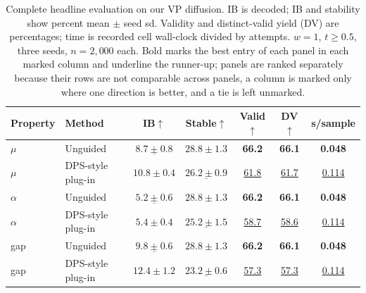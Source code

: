 \documentclass{article}
\begin{document}
\clearpage
\begin{table}[!htbp]
\centering\small
\caption{Complete headline evaluation on our VP diffusion. IB is decoded; IB and stability show percent mean $\pm$ seed sd. Validity and distinct-valid yield (DV) are percentages; time is recorded cell wall-clock divided by attempts. $w=1$, $t\ge0.5$, three seeds, $n=2{,}000$ each. Bold marks the best entry of each panel in each marked column and underline the runner-up; panels are ranked separately because their rows are not comparable across panels, a column is marked only where one direction is better, and a tie is left unmarked.}
\label{tab:full-vp}
\begin{tabular}{llccccc}
\toprule
Property & Method & IB$\uparrow$ & Stable$\uparrow$ & Valid$\uparrow$ & DV$\uparrow$ & s/sample\\
\midrule
$\mu$ & Unguided & $\underline{8.7\pm0.8}$& $\mathbf{28.8\pm1.3}$& \textbf{66.2}& \textbf{66.1}& \textbf{0.048}\\
$\mu$ & DPS-style plug-in & $\mathbf{10.8\pm0.4}$& $\underline{26.2\pm0.9}$& \underline{61.8}& \underline{61.7}& \underline{0.114}\\
\midrule
$\alpha$ & Unguided & $\underline{5.2\pm0.6}$& $\mathbf{28.8\pm1.3}$& \textbf{66.2}& \textbf{66.1}& \textbf{0.048}\\
$\alpha$ & DPS-style plug-in & $\mathbf{5.4\pm0.4}$& $\underline{25.2\pm1.5}$& \underline{58.7}& \underline{58.6}& \underline{0.114}\\
\midrule
gap & Unguided & $\underline{9.8\pm0.6}$& $\mathbf{28.8\pm1.3}$& \textbf{66.2}& \textbf{66.1}& \textbf{0.048}\\
gap & DPS-style plug-in & $\mathbf{12.4\pm1.2}$& $\underline{23.2\pm0.6}$& \underline{57.3}& \underline{57.3}& \underline{0.114}\\
\bottomrule
\end{tabular}
\end{table}
\end{document}
